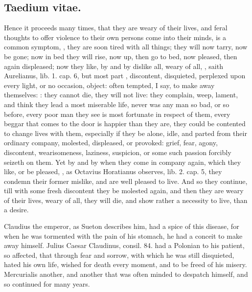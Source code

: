 {\subsection{\textlatin{Taedium vitae}.}
Hence it proceeds many times, that they are weary of
their lives, and feral thoughts to offer violence to their own persons
come into their minds,  is a common symptom, , they are soon tired with all things; they will now
tarry, now be gone; now in bed they will rise, now up, then go to bed,
now pleased, then again displeased; now they like, by and by dislike
all, weary of all, , saith
Aurelianus, lib. 1. cap. 6, but most part ,
discontent, disquieted, perplexed upon every light, or no occasion,
object: often tempted, I say, to make away themselves: : they cannot die, they will not live: they
complain, weep, lament, and think they lead a most miserable life,
never was any man so bad, or so before, every poor man they see is most
fortunate in respect of them, every beggar that comes to the door is
happier than they are, they could be contented to change lives with
them, especially if they be alone, idle, and parted from their ordinary
company, molested, displeased, or provoked: grief, fear, agony,
discontent, wearisomeness, laziness, suspicion, or some such passion
forcibly seizeth on them. Yet by and by when they come in company
again, which they like, or be pleased, , as Octavius Horatianus observes, lib. 2.
cap. 5, they condemn their former mislike, and are well pleased to
live. And so they continue, till with some fresh discontent they be
molested again, and then they are weary of their lives, weary of all,
they will die, and show rather a necessity to live, than a desire.

Claudius the emperor, as Sueton describes him, had a spice of
this disease, for when he was tormented with the pain of his stomach,
he had a conceit to make away himself. Julius Caesar Claudinus, consil.
84. had a Polonian to his patient, so affected, that through fear
and sorrow, with which he was still disquieted, hated his own life,
wished for death every moment, and to be freed of his misery.
Mercurialis another, and another that was often minded to despatch
himself, and so continued for many years.

}
